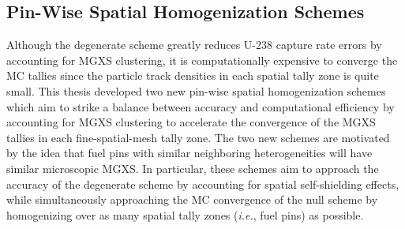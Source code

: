 



\subsection{Pin-Wise Spatial Homogenization Schemes}
\label{subsec:chap12-homogenization-schemes}

Although the degenerate scheme greatly reduces U-238 capture rate errors by accounting for \ac{MGXS} clustering, it is computationally expensive to converge the \ac{MC} tallies since the particle track densities in each spatial tally zone is quite small. This thesis developed two new pin-wise spatial homogenization schemes which aim to strike a balance between accuracy and computational efficiency by accounting for \ac{MGXS} clustering to accelerate the convergence of the \ac{MGXS} tallies in each fine-spatial-mesh tally zone. The two new schemes are motivated by the idea that fuel pins with similar neighboring heterogeneities will have similar microscopic \ac{MGXS}. In particular, these schemes aim to approach the accuracy of the degenerate scheme by accounting for spatial self-shielding effects, while simultaneously approaching the \ac{MC} convergence of the null scheme by homogenizing over as many spatial tally zones (\textit{i.e.}, fuel pins) as possible.


